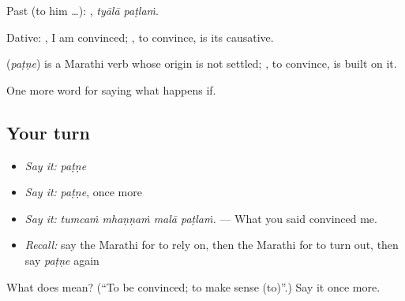 Past (to him …):  , \emph{tyālā paṭlaṁ}.

Dative:  , I am convinced; , to convince, is its causative.

\begin{cousinweb}
\textbf{} (\emph{paṭṇe}) is a Marathi verb whose origin is not settled; , to convince, is built on it.
\end{cousinweb}

\begin{grammarlens}[title={What you've built}]
One more word for saying what happens if.
\end{grammarlens}

\subsection*{Your turn}
\begin{itemize}
\raggedright
  \item \emph{Say it:} \emph{paṭṇe}
  \item \emph{Say it:} \emph{paṭṇe}, once more
  \item \emph{Say it:} \emph{tumcaṁ mhaṇṇaṁ malā paṭlaṁ.} — What you said convinced me.
  \item \emph{Recall:} say the Marathi for to rely on, then the Marathi for to turn out, then say \emph{paṭṇe} again
\end{itemize}

\begin{tcolorbox}[breakable,colback=teal!4,colframe=teal!35!black,title={Before you move on}]
What does  mean? (\textquotedblleft{}To be convinced; to make sense (to)\textquotedblright{}.) Say it once more.
\end{tcolorbox}
